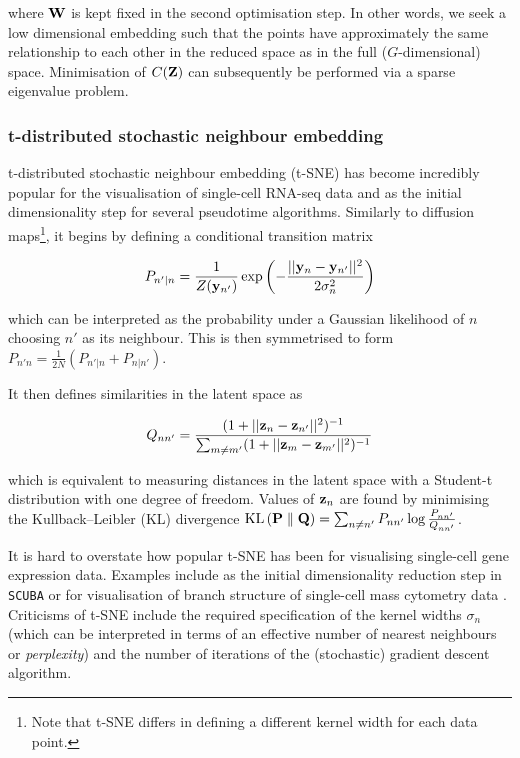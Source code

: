where $\mathbf{W}$ is kept fixed in the second optimisation step. In other words, we seek a low dimensional embedding such that the points have approximately the same relationship to each other in the reduced space as in the full ($G$-dimensional) space. Minimisation of $C(\mathbf{Z})$ can subsequently be performed via a sparse eigenvalue problem.

\subsubsection{t-distributed stochastic neighbour embedding} \label{sec:tsne}

t-distributed stochastic neighbour embedding (t-SNE) \cite{maaten2008visualizing} has become incredibly popular for the visualisation of single-cell RNA-seq data and as the initial dimensionality step for several pseudotime algorithms. Similarly to diffusion maps\footnote{
Note that t-SNE differs in defining a different kernel width for each data point.
}, it begins by defining a conditional transition matrix

\begin{equation}
  P_{n'|n} = \frac{1}{Z(\mathbf{y}_{n'})} \exp\left( - \frac{\lvert \lvert \mathbf{y}_n - \mathbf{y}_{n'} \rvert \rvert^2}{2 \sigma_n^2}\right)
\end{equation}

which can be interpreted as the probability under a Gaussian likelihood of $n$ choosing $n'$ as its neighbour. This is then symmetrised to form $P_{n'n} = \frac{1}{2N}(  P_{n'|n} +   P_{n|n'})$.

It then defines similarities in the latent space as

\begin{equation}
  Q_{nn'} = \frac{
  (1 + \lvert \lvert \mathbf{z}_n - \mathbf{z}_{n'} \rvert \rvert^2)^{-1}
  }{
  \sum_{m \neq m'} (1 + \lvert \lvert \mathbf{z}_m - \mathbf{z}_{m'} \rvert \rvert^2)^{-1}
  }
\end{equation}

which is equivalent to measuring distances in the latent space with a Student-t distribution with one degree of freedom. Values of $\mathbf{z}_n$ are found by minimising the Kullback–Leibler (KL) divergence
$\textrm{KL}\left(\mathbf{P}\;\|\;\mathbf{Q}\right) = \sum_{n \neq n'} P_{nn'} \log \frac{P_{nn'}}{Q_{nn'}}$.

It is hard to overstate how popular t-SNE has been for visualising single-cell gene expression data. Examples include as the initial dimensionality reduction step in \texttt{SCUBA} \cite{marco2014bifurcation} or for visualisation of branch structure of single-cell mass cytometry data \cite{setty2016wishbone}. Criticisms of t-SNE include the required specification of the kernel widths $\sigma_n$ (which can be interpreted in terms of an effective number of nearest neighbours or \emph{perplexity}) and the number of iterations of the (stochastic) gradient descent algorithm.


